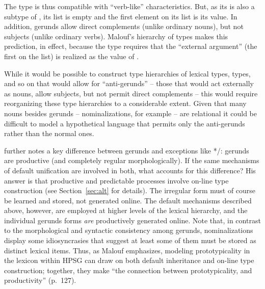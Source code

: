 \documentclass[output=paper
 	        ,biblatex
                ,babelshorthands
                ,newtxmath
                ,draftmode
                ,colorlinks, citecolor=brown
]{langscibook}
\begin{document}
\begin{exe}
\ex\label{vger}
\end{exe}

The type  is thus compatible with ``verb-like'' characteristics.
But, as its  is also a subtype of , its  list is empty and the first element on its  list is its  value. In addition, gerunds allow direct complements (unlike ordinary nouns), but not subjects (unlike ordinary verbs).
Malouf's hierarchy of types makes this prediction, in effect, because the  type requires that the ``external argument'' (the first on the  list) is realized as the value of .


While it would be possible to construct type hierarchies of lexical types,  types, and so on that would allow for ``anti-gerunds'' -- those that would act externally as nouns, allow subjects, but not permit direct complements -- this would require reorganizing these type hierarchies to a considerable extent.
Given that many nouns besides gerunds -- nominalizations, for example -- are relational it could be difficult to model a hypothetical language that permits only the anti-gerunds rather than the normal ones.

\citeauthor{Malouf2000a} further notes a key difference between gerunds and exceptions like */:  gerunds are productive (and completely regular morphologically).
If the same mechanisms of default unification are involved in both, what accounts for this difference?
His answer is that productive and predictable processes involve on-line type construction (see Section~\ref{sec:alt} for details).
The irregular form  must of course be learned and stored, not generated online.
The default mechanisms described above, however, are employed at higher levels of the lexical hierarchy, and the individual gerunds forms \emph{are} productively generated online.
Note that, in contrast to the morphological and syntactic consistency among gerunds,  nominalizations display some idiosyncrasies that suggest at least some of them must be stored as distinct lexical items.
Thus, as Malouf emphasizes, modeling prototypicality in the lexicon within HPSG can draw on both default inheritance and on-line type construction; together, they make ``the connection between prototypicality, and productivity'' (p.\ 127).
\end{document}
